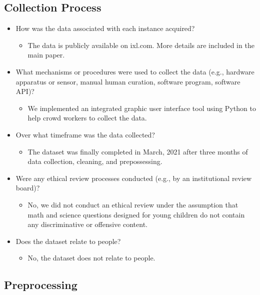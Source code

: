\documentclass{article}
\begin{document}
\subsection{Collection Process}
\begin{itemize}
    \item How was the data associated with each instance acquired?
    \begin{itemize}
        \item The data is publicly available on ixl.com. More details are included in the main paper.
    \end{itemize}
    \item What mechanisms or procedures were used to collect the data (e.g., hardware apparatus or sensor, manual human curation, software program, software API)?
    \begin{itemize}
\item We implemented an integrated graphic user interface tool using Python to help crowd workers to collect the data.
    \end{itemize}
    \item Over what timeframe was the data collected?
    \begin{itemize}
        \item The dataset was finally completed in March, 2021 after three months of data collection, cleaning, and prepossessing.
    \end{itemize}
    \item Were any ethical review processes conducted (e.g., by an institutional review board)?
    \begin{itemize}
        \item No, we did not conduct an ethical review under the assumption that math and science questions designed for young children do not contain any discriminative or offensive content.
    \end{itemize}
    \item Does the dataset relate to people?
    \begin{itemize}
        \item No, the dataset does not relate to people.
    \end{itemize}
\end{itemize}

\subsection{Preprocessing}
\end{document}

